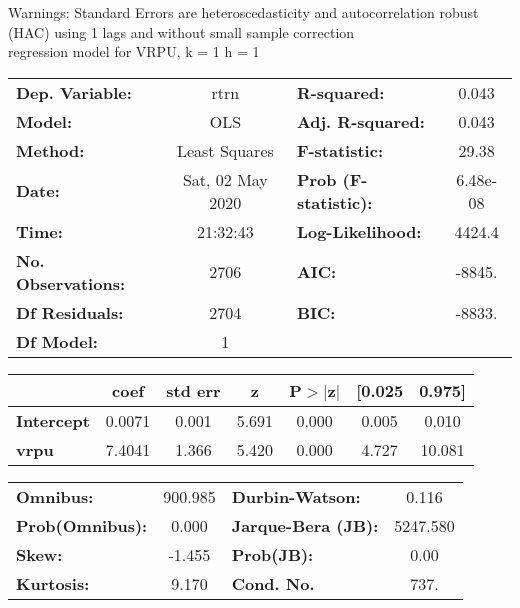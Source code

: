 Warnings: \newline
 [1] Standard Errors are heteroscedasticity and autocorrelation robust (HAC) using 1 lags and without small sample correction\\ 

regression model for VRPU, k = 1 h = 1\begin{center}
\begin{tabular}{lclc}
\toprule
\textbf{Dep. Variable:}    &       rtrn       & \textbf{  R-squared:         } &     0.043   \\
\textbf{Model:}            &       OLS        & \textbf{  Adj. R-squared:    } &     0.043   \\
\textbf{Method:}           &  Least Squares   & \textbf{  F-statistic:       } &     29.38   \\
\textbf{Date:}             & Sat, 02 May 2020 & \textbf{  Prob (F-statistic):} &  6.48e-08   \\
\textbf{Time:}             &     21:32:43     & \textbf{  Log-Likelihood:    } &    4424.4   \\
\textbf{No. Observations:} &        2706      & \textbf{  AIC:               } &    -8845.   \\
\textbf{Df Residuals:}     &        2704      & \textbf{  BIC:               } &    -8833.   \\
\textbf{Df Model:}         &           1      & \textbf{                     } &             \\
\bottomrule
\end{tabular}
\begin{tabular}{lcccccc}
                   & \textbf{coef} & \textbf{std err} & \textbf{z} & \textbf{P$> |$z$|$} & \textbf{[0.025} & \textbf{0.975]}  \\
\midrule
\textbf{Intercept} &       0.0071  &        0.001     &     5.691  &         0.000        &        0.005    &        0.010     \\
\textbf{vrpu}      &       7.4041  &        1.366     &     5.420  &         0.000        &        4.727    &       10.081     \\
\bottomrule
\end{tabular}
\begin{tabular}{lclc}
\textbf{Omnibus:}       & 900.985 & \textbf{  Durbin-Watson:     } &    0.116  \\
\textbf{Prob(Omnibus):} &   0.000 & \textbf{  Jarque-Bera (JB):  } & 5247.580  \\
\textbf{Skew:}          &  -1.455 & \textbf{  Prob(JB):          } &     0.00  \\
\textbf{Kurtosis:}      &   9.170 & \textbf{  Cond. No.          } &     737.  \\
\bottomrule
\end{tabular}
\end{center}

